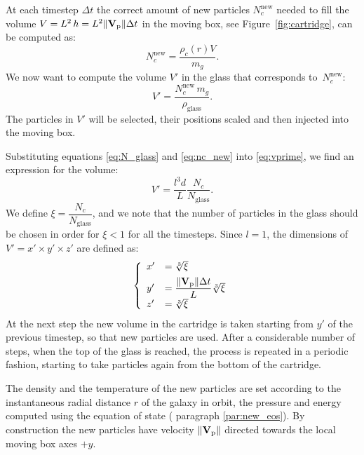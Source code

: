 At each timestep $\Delta t$ the correct amount of new particles $N_c^{\mathrm{new}}$ needed to fill the volume $V = L^2\, h = L^2 \norm{\boldsymbol{\mathbf{V}}_{\mathrm p}}\Delta t$ in the moving box, see Figure~\ref{fig:cartridge}, can be computed as:
\begin{equation}
 N_c^{\mathrm{new}} = \dfrac{\rho_c(r) V}{m_g}.
 \label{eq:nc_new}
\end{equation}
We now want to compute the volume $V'$ in the glass that corresponds to~$N_c^{\mathrm{new}}$:
\begin{equation}
  V' = \frac{N_c^{\mathrm{new}} \, m_g}{\rho_{\text{glass}}}.
\label{eq:vprime}
\end{equation}
The particles in $V'$ will be selected, their positions scaled and then injected into the moving box.

Substituting equations \eqref{eq:N_glass} and \eqref{eq:nc_new} into \eqref{eq:vprime}, we find an expression for the volume:
\begin{equation}
  V' = \frac{l^3 d}{L} \frac{N_c}{N_{\text{glass}}}.
\end{equation}
We define $\xi=\dfrac{N_c}{N_{\text{glass}}}$, and we note that the number of particles in the glass should be chosen in order for $\xi<1$ for all the timesteps.
Since $l=1$, the dimensions of $V' = x' \times y' \times z'$ are defined as:
\begin{equation}
  \left\{
  \begin{array}{ll}
    x' &= \sqrt[3]{\xi} \\[1ex]
    y' &= \dfrac{\norm{\boldsymbol{\mathbf{V}}_{\mathrm p}}\Delta t}{L} \sqrt[3]{\xi} \\[1ex]
    z' &= \sqrt[3]{\xi}
  \end{array}
  \right.
\end{equation}
At the next step the new volume in the cartridge is taken starting from $y'$ of the previous timestep, so that new particles are used.
After a considerable number of steps, when the top of the glass is reached, the process is repeated in a periodic fashion, starting to take particles again from the bottom of the cartridge.

The density and the temperature of the new particles are set according to the instantaneous radial distance $r$ of the galaxy in orbit, the pressure and energy computed using the equation of state (\cf{} paragraph \ref{par:new_eos}).
By construction the new particles have velocity $\norm{\boldsymbol{\mathbf{V}}_{\mathrm p}}$ directed towards the local moving box axes $+y$.

